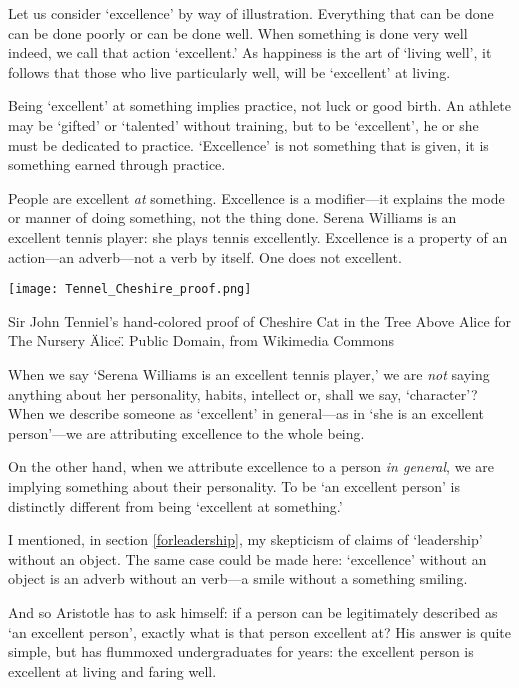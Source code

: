 Let us consider `excellence' by way of illustration. Everything that can be done can be done poorly or can be done well. When something is done very well indeed, we call that action `excellent.' As happiness is the art of `living well', it follows that those who live particularly well, will be `excellent' at living. 

Being `excellent' at something implies practice, not luck or good birth. An athlete may be `gifted' or `talented' without training, but to be `excellent', he or she must be dedicated to practice. `Excellence' is not something that is given, it is something earned through practice. 

 People are excellent \emph{at} something. Excellence is a modifier---it explains the mode or manner of doing something, not the thing done. Serena Williams is an excellent tennis player: she plays tennis excellently. Excellence is a property of an action---an adverb---not a verb by itself. One does not excellent. \begin{marginfigure}\texttt{[image: Tennel\_Cheshire\_proof.png]}\caption{Sir John Tenniel's hand-colored proof of Cheshire Cat in the Tree Above Alice for The Nursery \"Alice\". Public Domain, from Wikimedia Commons }\label{fig:chesire}\end{marginfigure}

When we say `Serena Williams is an excellent tennis player,' we are \emph{not} saying anything about her personality, habits, intellect or, shall we say, `character'? When we describe someone as `excellent' in general---as in `she is an excellent person'---we are attributing excellence to the whole being. 

On the other hand, when we attribute excellence to a person \emph{in general}, we are implying something about their personality. To be `an excellent person' is distinctly different from being `excellent at something.' 

I mentioned, in section \ref{forleadership}, my skepticism of claims of `leadership' without an object. The same case could be made here: `excellence' without an object is an adverb without an verb---a smile without a something smiling. 

And so Aristotle has to ask himself: if a person can be legitimately described as `an excellent person', exactly what is that person excellent at? His answer is quite simple, but has flummoxed undergraduates for years: the excellent person is excellent at living and faring well. 


